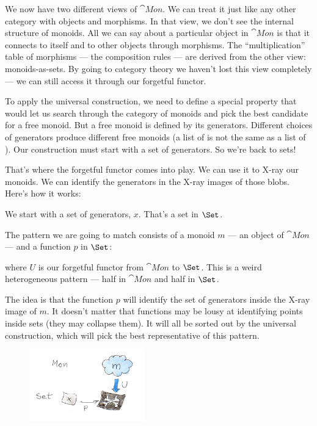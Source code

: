 We now have two different views of $\cat{Mon}$. We can treat it just
like any other category with objects and morphisms. In that view, we
don't see the internal structure of monoids. All we can say about a
particular object in $\cat{Mon}$ is that it connects to itself and to
other objects through morphisms. The ``multiplication'' table of
morphisms --- the composition rules --- are derived from the other view:
monoids-as-sets. By going to category theory we haven't lost this view
completely --- we can still access it through our forgetful functor.

To apply the universal construction, we need to define a special
property that would let us search through the category of monoids and
pick the best candidate for a free monoid. But a free monoid is defined
by its generators. Different choices of generators produce different
free monoids (a list of  is not the same as a list of
). Our construction must start with a set of generators. So
we're back to sets!

That's where the forgetful functor comes into play. We can use it to
X-ray our monoids. We can identify the generators in the X-ray images of
those blobs. Here's how it works:

We start with a set of generators, $x$. That's a set in
$\Set$.

The pattern we are going to match consists of a monoid $m$ --- an
object of $\cat{Mon}$ --- and a function $p$ in $\Set$:

where $U$ is our forgetful functor from $\cat{Mon}$ to
$\Set$. This is a weird heterogeneous pattern --- half in
$\cat{Mon}$ and half in $\Set$.

The idea is that the function $p$ will identify the set of
generators inside the X-ray image of $m$. It doesn't matter that
functions may be lousy at identifying points inside sets (they may
collapse them). It will all be sorted out by the universal construction,
which will pick the best representative of this pattern.

\begin{figure}[H]
\centering
\includegraphics[width=50mm]{images/monoid-pattern.jpg}
\end{figure}

